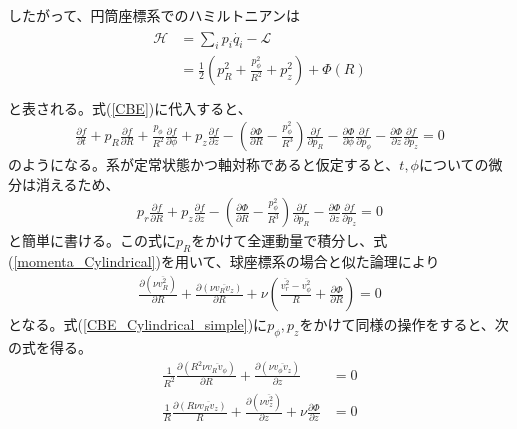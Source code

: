 したがって、円筒座標系でのハミルトニアンは
\begin{align}
\begin{aligned}
	\mathcal{H} &= \sum_i p_i \dot{q_i} - \mathcal{L} \\
	&= \frac{1}{2}\left(p_R^2 + \frac{p_{\phi}^2}{R^2} + p_z^2 \right) + \Phi(R) \\
\end{aligned}
\end{align}
と表される。式(\ref{CBE})に代入すると、
\begin{align}
	\frac{\partial f}{\partial t} + p_R\frac{\partial f}{\partial R} + \frac{p_{\phi}}{R^2}\frac{\partial f}{\partial \phi} + p_z\frac{\partial f}{\partial z} - \left(\frac{\partial \Phi}{\partial R} - \frac{p_{\phi}^2}{R^3} \right)\frac{\partial f}{\partial p_R} - \frac{\partial \Phi}{\partial \phi}\frac{\partial f}{\partial p_{\phi}} - \frac{\partial \Phi}{\partial z}\frac{\partial f}{\partial p_z} = 0   \label{CBE_Cylindrical}
\end{align}
のようになる。系が定常状態かつ軸対称であると仮定すると、$t,\phi$についての微分は消えるため、
\begin{align}
	p_r\frac{\partial f}{\partial R} + p_z\frac{\partial f}{\partial z} - \left(\frac{\partial \Phi}{\partial R} - \frac{p_{\phi}^2}{R^3} \right)\frac{\partial f}{\partial p_R} - \frac{\partial \Phi}{\partial z}\frac{\partial f}{\partial p_z} = 0    \label{CBE_Cylindrical_simple}
\end{align}
と簡単に書ける。この式に$p_R$をかけて全運動量で積分し、式(\ref{momenta_Cylindrical})を用いて、球座標系の場合と似た論理により
\begin{align}
	\frac{\partial (\nu \overline{v_R^2})}{\partial R} + \frac{\partial (\nu \overline{v_R v_z})}{\partial R} + \nu\left(\frac{\overline{v_r^2} - \overline{v_{\phi}^2}}{R} + \frac{\partial \Phi}{\partial R} \right) = 0   \label{Jeans_Cylindrical_pr}
\end{align}
となる。式(\ref{CBE_Cylindrical_simple})に$p_{\phi}, p_z$をかけて同様の操作をすると、次の式を得る。
\begin{align}
	\frac{1}{R^2}\frac{\partial (R^2\nu \overline{v_R v_{\phi}})}{\partial R} + \frac{\partial (\nu \overline{v_{\phi} v_z})}{\partial z} &= 0 \label{Jeans_Cylindrical_pphi}  \\
	\frac{1}{R}\frac{\partial(R\nu\overline{v_R v_z})}{R} + \frac{\partial(\nu\overline{v_z^2})}{\partial z} + \nu\frac{\partial \Phi}{\partial z} &= 0   \label{Jeans_Cylindrical_pz}
\end{align}

